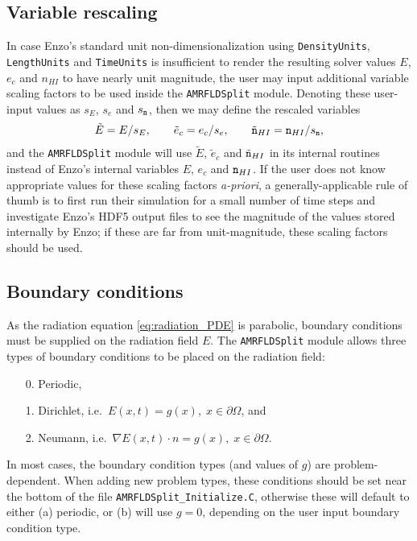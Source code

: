 \documentclass[letterpaper,10pt]{article}
\renewcommand{\(}{\left(}
\renewcommand{\)}{\right)}
\newcommand{\mn}{{\tt n}}
\begin{document}
\subsection{Variable rescaling}
\label{sec:AMRFLDSplit_variable_rescaling}

In case Enzo's standard unit non-dimensionalization using 
{\tt DensityUnits}, {\tt LengthUnits} and {\tt TimeUnits} is
insufficient to render the resulting solver values $E$, $e_c$ and
$n_{HI}$ to have nearly unit magnitude, the user may input additional
variable scaling factors to be used inside the {\tt AMRFLDSplit}
module.  Denoting these user-input values as $s_E$, $s_e$ and
$s_{\mn}$, then we may define the rescaled variables
\begin{align}
\label{eq:variable_rescaling}
  \tilde{E} = E / s_E, \qquad \tilde{e}_c = e_c / s_e, \qquad 
  \tilde{\mn}_{HI} = \mn_{HI} / s_{\mn},
\end{align}
and the {\tt AMRFLDSplit} module will use $\tilde{E}$, $\tilde{e}_c$ and
$\tilde{\mn}_{HI}$ in its internal routines instead of Enzo's internal
variables $E$, $e_c$ and $\mn_{HI}$.  If the user does not know
appropriate values for these scaling factors {\em a-priori}, a
generally-applicable rule of thumb is to first run their simulation
for a small number of time steps and investigate Enzo's HDF5 output
files to see the magnitude of the values stored internally by Enzo; if
these are far from unit-magnitude, these scaling factors should be
used. 



\subsection{Boundary conditions}
\label{sec:AMRFLDSplit_boundary_conditions}

As the radiation equation \eqref{eq:radiation_PDE} is parabolic,
boundary conditions must be supplied on the radiation field $E$.  The
{\tt AMRFLDSplit} module allows three types of boundary conditions to
be placed on the radiation field:
\begin{itemize}
\item[0.] Periodic,
\item[1.] Dirichlet, i.e.~$E(x,t) = g(x), \; x\in\partial\Omega$, and
\item[2.] Neumann, i.e.~$\nabla E(x,t)\cdot n = g(x), \; x\in\partial\Omega$.
\end{itemize}
In most cases, the boundary condition types (and values of $g$) are
problem-dependent.  When adding new problem types, these conditions
should be set near the bottom of the file {\tt AMRFLDSplit\_Initialize.C}, 
otherwise these will default to either (a) periodic, or (b) will use
$g=0$, depending on the user input boundary condition type.
\end{document}
